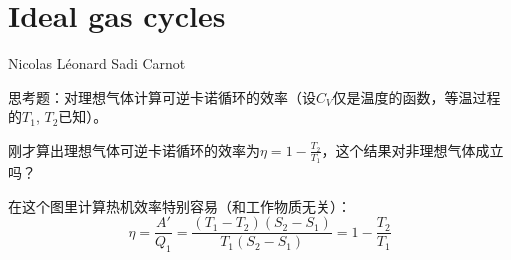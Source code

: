 \documentclass[CJK]{beamer}
\begin{document}
\begin{frame}
\bch
{}
\ech
\end{frame}

\begin{frame}
\bch
{}
\ech
\end{frame}


\begin{frame}
\bch
{}
\ech
\end{frame}

\begin{frame}
\bch
{}
\ech
\end{frame}


\section{Ideal gas cycles}



\begin{frame}
\bchL

\emini
{}
\bcenter
Nicolas Léonard Sadi Carnot
\ecenter
\emini
\echL
\end{frame}


\begin{frame}
\bch


\ech
\end{frame}

\begin{frame}
\bchL
{}

思考题：对理想气体计算可逆卡诺循环的效率（设$C_V$仅是温度的函数，等温过程的$T_1$, $T_2$已知）。
\echL
\end{frame}


\begin{frame}
\bchL
刚才算出理想气体可逆卡诺循环的效率为$\eta = 1-\frac{T_2}{T_1}$，这个结果对非理想气体成立吗？
\echL
\end{frame}

\begin{frame}
\bchL
{}

在这个图里计算热机效率特别容易（和工作物质无关）：
$$\eta = \frac{A'}{Q_1} = \frac{(T_1-T_2)(S_2-S_1)}{T_1(S_2-S_1)} = 1- \frac{T_2}{T_1}$$

\echL
\end{frame}
\end{document}
